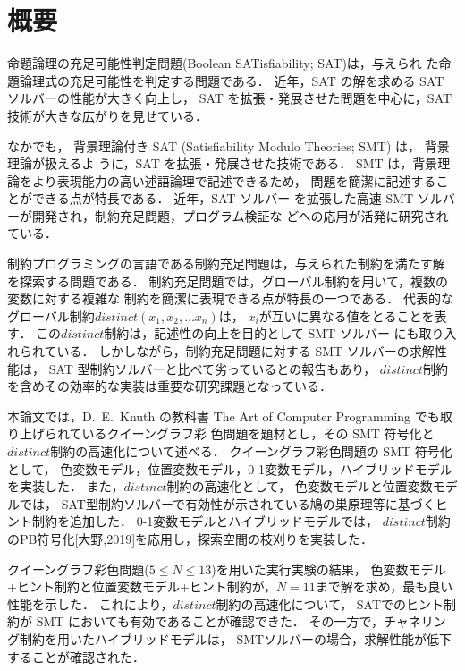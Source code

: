 \chapter*{概要}


命題論理の充足可能性判定問題(Boolean SATisfiability; SAT)は，与えられ
た命題論理式の充足可能性を判定する問題である．
近年，SAT の解を求める SAT ソルバーの性能が大きく向上し，
SAT を拡張・発展させた問題を中心に，SAT 技術が大きな広がりを見せている．

なかでも，
背景理論付き SAT (Satisfiability Modulo Theories; SMT) は，
背景理論が扱えるよ
うに，SAT を拡張・発展させた技術である．
SMT は，背景理論をより表現能力の高い述語論理で記述できるため，
問題を簡潔に記述することができる点が特長である．
近年，SAT ソルバー
を拡張した高速 SMT ソルバーが開発され，制約充足問題，プログラム検証な
どへの応用が活発に研究されている．

制約プログラミングの言語である制約充足問題は，与えられた制約を満たす解
を探索する問題である．
制約充足問題では，グローバル制約を用いて，複数の変数に対する複雑な
制約を簡潔に表現できる点が特長の一つである．
代表的なグローバル制約$distinct(x_{1},x_{2},\ldots x_{n})$は，
$x_{i}$が互いに異なる値をとることを表す．
この$distinct$制約は，記述性の向上を目的として SMT ソルバー
にも取り入れられている．
しかしながら，制約充足問題に対する SMT ソルバーの求解性能は，
SAT 型制約ソルバーと比べて劣っているとの報告もあり，
$distinct$制約を含めその効率的な実装は重要な研究課題となっている．

本論文では，D.~E.~Knuth の教科書
The Art of Computer Programming
でも取り上げられているクイーングラフ彩
色問題を題材とし，その SMT 符号化と$distinct$制約の高速化について述べる．
クイーングラフ彩色問題の SMT 符号化として，
色変数モデル，位置変数モデル，0-1変数モデル，ハイブリッドモデルを実装した．
また，$distinct$制約の高速化として，
色変数モデルと位置変数モデルでは，
SAT型制約ソルバーで有効性が示されている鳩の巣原理等に基づくヒント制約を追加した．
0-1変数モデルとハイブリッドモデルでは，
$distinct$制約のPB符号化[大野,2019]を応用し，探索空間の枝刈りを実装した．

クイーングラフ彩色問題($5\leq N \leq 13$)を用いた実行実験の結果，
色変数モデル+ヒント制約と位置変数モデル+ヒント制約が，$N=11$まで解を求め，最も良い性能を示した．
これにより，$distinct$制約の高速化について，
SATでのヒント制約が SMT においても有効であることが確認できた．
その一方で，チャネリング制約を用いたハイブリッドモデルは，
SMTソルバーの場合，求解性能が低下することが確認された．

